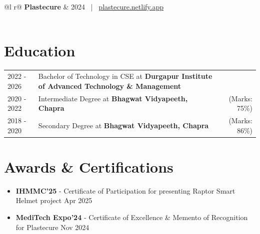 \documentclass[a4paper,11pt]{article}
\begin{document}
\begin{tabularx}{\linewidth}{ @{}l r@{} }
	\textbf{Plastecure} & \hfill 2024 \ | \ \href{https://plastecure.netlify.app}{plastecure.netlify.app} \\[2.75pt]
	                                                                                                            \\
\end{tabularx}

\section{Education}
\begin{tabularx}{\linewidth}{@{}l X r@{}}
	2022 - 2026 & Bachelor of Technology in CSE at \textbf{Durgapur Institute of Advanced Technology \& Management} \\

	2020 - 2022 & Intermediate Degree at \textbf{Bhagwat Vidyapeeth, Chapra} & \normalsize (Marks: 75\%) \\

	2018 - 2020 & Secondary Degree at \textbf{Bhagwat Vidyapeeth, Chapra} & \normalsize (Marks: 86\%) \\
\end{tabularx}

\section{Awards \& Certifications}
\begin{itemize}[leftmargin=1em]
	\item \textbf{IHMMC'25} - Certificate of Participation for presenting Raptor Smart Helmet project \hfill Apr 2025
	\item \textbf{MediTech Expo'24} - Certificate of Excellence \& Memento of Recognition for Plastecure \hfill Nov 2024
\end{itemize}
\end{document}
